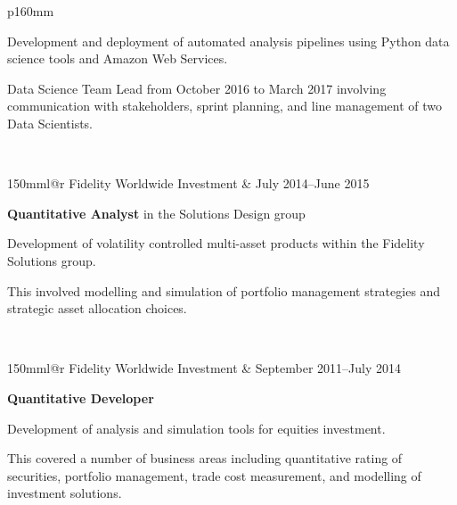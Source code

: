 \documentclass[10pt,a4paper]{article}
\makeatletter
\newcommand{\role}[6]{
\begin{tabular*}{150mm}{l@{\extracolsep{\fill}}r}
#5 & #1--#2 \\ 
\multicolumn{2}{p{145mm}}
{\textbf{#3}#4

{\small #6}} 
\end{tabular*}
\vspace{2mm}
 }
\makeatother
\begin{document}
\begin{tabular}{p{160mm}}
{{   Development and deployment of automated analysis pipelines using Python data science tools
   and Amazon Web Services.

   Data Science Team Lead from October 2016 to
   March 2017 involving communication with stakeholders, sprint planning, 
   and line management of two Data Scientists.}
  }\\
  \role{July 2014}{June 2015}{Quantitative Analyst}{ in the Solutions Design
  group}{Fidelity Worldwide Investment}
  {Development of volatility controlled multi-asset products 
  within the Fidelity Solutions group.

  \footnotesize{This involved modelling and simulation of portfolio management
  strategies and strategic asset allocation choices.}}\\
  \role{September 2011}{July 2014}{Quantitative Developer}{}
    {Fidelity Worldwide Investment}
    {Development of analysis and simulation tools for equities investment.

    \footnotesize{This
    covered a number of business areas including quantitative rating of
    securities, portfolio management, trade cost measurement, and
    modelling of investment solutions.

}}
\end{tabular}
\end{document}
